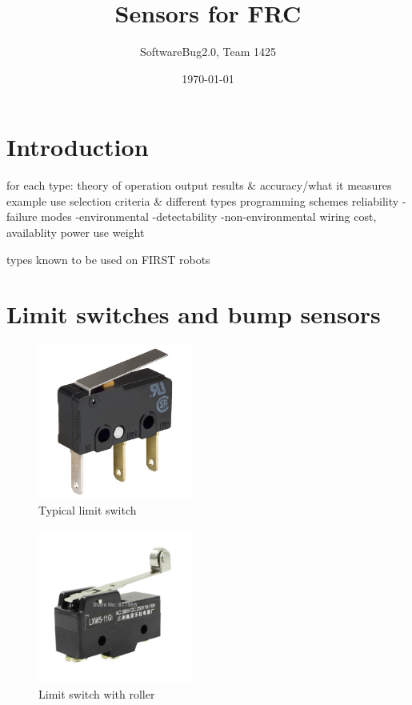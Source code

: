 \documentclass{article}
\begin{document}
\title{Sensors for FRC}

\author{SoftwareBug2.0, Team 1425}
\date{\today}

\maketitle

\tableofcontents

\section{Introduction}

for each type:
theory of operation
output results \& accuracy/what it measures
example use
selection criteria \& different types
programming schemes
reliability
	-failure modes
		-environmental
		-detectability
		-non-environmental
wiring
cost, availablity
power use
weight

types known to be used on FIRST robots

\section{Limit switches and bump sensors}

\begin{figure}[ht]
\centering
\includegraphics[width=2in]{Spdt_limit_switch.jpg}
\caption{Typical limit switch}
\end{figure}

\begin{figure}[ht]
\centering
\includegraphics[width=2in]{limit_wheel.jpg}
\caption{Limit switch with roller}
\end{figure}
\end{document}
